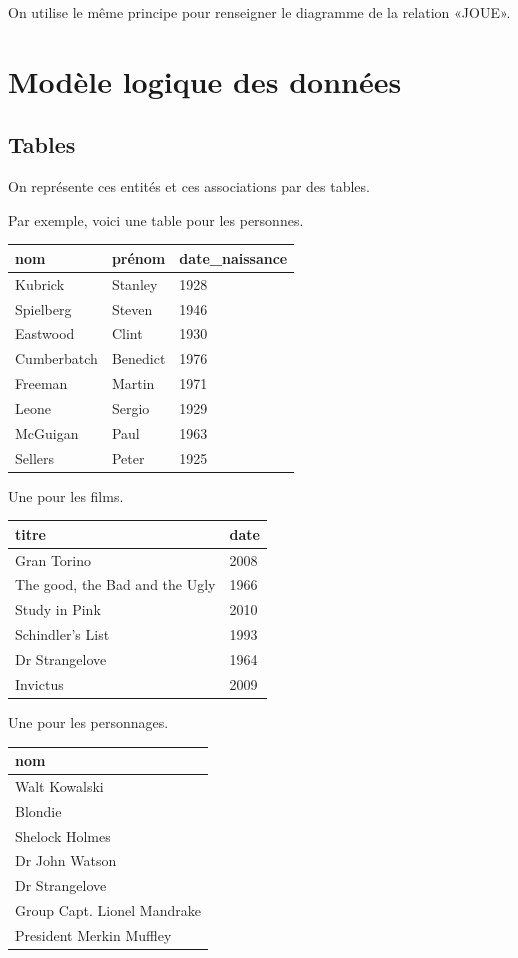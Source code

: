 On utilise le même principe pour renseigner le diagramme de la relation «JOUE».

\section{Modèle logique des données}
\subsection{Tables}
On représente ces entités et ces associations par des tables. 

Par exemple, voici une table pour les personnes.
\begin{center}
\begin{tabular}{lll}
\toprule
nom & prénom & date\_naissance\\
\midrule
Kubrick&Stanley&1928\\
Spielberg & Steven& 1946\\
Eastwood & Clint& 1930\\
Cumberbatch & Benedict & 1976\\
Freeman & Martin& 1971\\
Leone & Sergio & 1929 \\
McGuigan & Paul & 1963\\
Sellers&Peter&1925\\
\bottomrule
\end{tabular}
\end{center}
Une pour les films.
\begin{center}
\begin{tabular}{ll}
\toprule
  titre & date\\
\midrule
  Gran Torino & 2008\\
  The good, the Bad and the Ugly& 1966\\
  Study in Pink & 2010\\
  Schindler's List& 1993\\
  Dr Strangelove&1964\\
  Invictus& 2009\\
\bottomrule
\end{tabular}
\end{center}
Une pour les personnages.
\begin{center}
\begin{tabular}{l}
\toprule
  nom\\
\midrule
  Walt Kowalski\\
  Blondie\\
  Shelock Holmes\\
  Dr John Watson\\
  Dr Strangelove\\
  Group Capt. Lionel Mandrake\\
  President Merkin Muffley\\
\bottomrule
\end{tabular}
\end{center}
